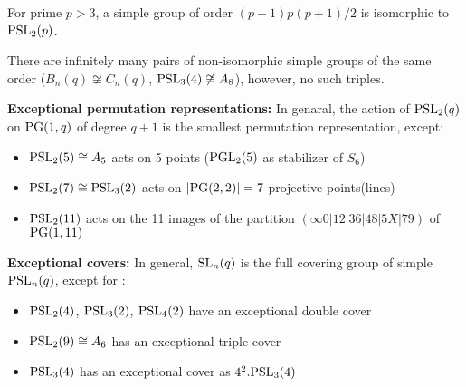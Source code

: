 \documentclass[a4paper,11pt]{article}
\begin{document}
\begin{theorem}
    For prime $p > 3$, a simple group of order $(p - 1)p(p + 1)/2$ is isomorphic to $\mathrm{PSL}_2(p)$.
\end{theorem}

\begin{proposition}
    There are infinitely many pairs of non-isomorphic simple
groups of the same order ($B_n(q) \not\cong C_n(q)$, $\mathrm{PSL}_3(4) \not\cong A_8$), however, no such triples.
\end{proposition}



\noindent\textbf{Exceptional permutation representations:}
In genaral, the action of
$\mathrm{PSL}_2(q)$ on $\mathrm{PG}(1,q)$ of degree $q + 1$ is the smallest permutation representation, except:
\begin{itemize}
    \item $\mathrm{PSL}_2(5)\cong A_5$ acts on 5 points ($\mathrm{PGL}_2(5)$ as stabilizer of $S_6$)
    \item $\mathrm{PSL}_2(7)\cong \mathrm{PSL}_3(2)$ acts on $|\mathrm{PG}(2,2)|=7$ projective points(lines)
    \item $\mathrm{PSL}_2(11)$ acts on the 11 images of the partition $(\infty 0|12|36|48|5X|79)$ of $\mathrm{PG}(1, 11)$
\end{itemize}




\noindent\textbf{Exceptional covers:}
In general, $\mathrm{SL}_n(q)$ is the full covering group of simple $\mathrm{PSL}_n(q)$, except for :
\begin{itemize}
    \item $\mathrm{PSL}_2(4)$, $\mathrm{PSL}_3(2)$, $\mathrm{PSL}_4(2)$ have an exceptional double cover
    \item $\mathrm{PSL}_2(9)\cong A_6$ has an exceptional triple cover
    \item $\mathrm{PSL}_3(4)$ has an exceptional cover as $4^2.\mathrm{PSL}_3(4)$
\end{itemize}


\ifx\ChapThreeSecThree\undefined %
     
\end{document}
